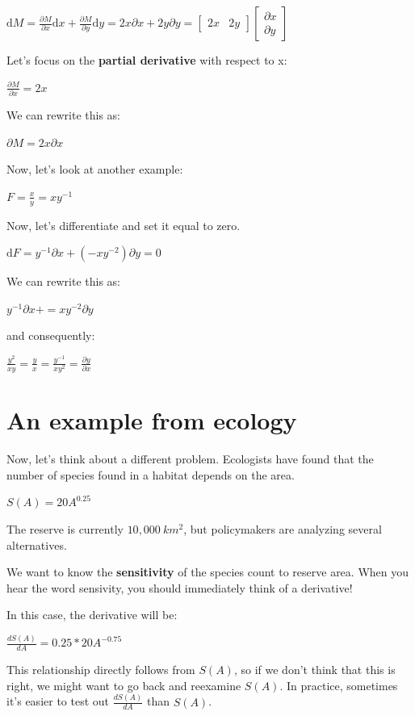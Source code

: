 \documentclass[12pt]{article}
\begin{document}
\(\mathrm{d}M =
\frac{\partial M}{\partial x}\mathrm{d}x
+
\frac{\partial M}{\partial y}\mathrm{d}y = 2x \partial x + 2y \partial y =
\begin{bmatrix}
2x & 2y
\end{bmatrix}
\begin{bmatrix}
 \partial x\\
\partial y
\end{bmatrix}\)

Let's focus on the \textbf{partial derivative} with respect to x:

\(\frac{\partial M}{\partial x}=2x\)

We can rewrite this as:

\(\partial M=2x \partial x\)

Now, let's look at another example:

\(F= \frac{x}{y}=xy^{-1}\)

Now, let's differentiate and set it equal to zero.

\(\mathrm{d}F=y^{-1} \partial x + (-xy^{-2}) \partial y = 0\)

We can rewrite this as:

\(y^{-1} \partial x +=xy^{-2} \partial y\)

and consequently:

\( \frac{y^2}{xy}= \frac{y}{x} = \frac{y^{-1}}{xy^2} = \frac{\partial y}{\partial x}\)

\section{An example from ecology}
Now, let's think about a different problem. Ecologists have found that the number of species found in a habitat depends on the area. 

\(S(A)=20A^{0.25}\)

The reserve is currently \(10,000 \ km^2\), but policymakers are analyzing several alternatives. 

We want to know the \textbf{sensitivity} of the species count to reserve area. When you hear the word sensivity, you should immediately think of a derivative!

In this case, the derivative will be:

\( \frac{dS(A)}{dA}=0.25*20A^{-0.75}\)

This relationship directly follows from \(S(A)\), so if we don't think that this is right, we might want to go back and reexamine \(S(A)\). In practice, sometimes it's easier to test out \( \frac{dS(A)}{dA}\) than \(S(A)\). 
\end{document}
